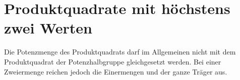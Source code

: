 \section{Produktquadrate mit höchstens zwei Werten}
Die Potenzmenge des Produktquadrats darf im Allgemeinen nicht mit dem
Produktquadrat der Potenzhalbgruppe gleichgesetzt werden. Bei einer
Zweiermenge reichen jedoch die Einermengen und der ganze Träger aus.

